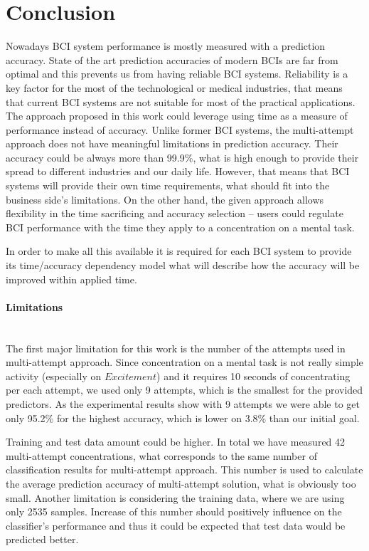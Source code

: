 \documentclass[12pt]{article}
\theoremstyle{definition}
\begin{document}
\newpage
\section*{Conclusion}

Nowadays BCI system performance is mostly measured with a prediction accuracy. State of the art prediction accuracies of modern BCIs are far from optimal and this prevents us from having reliable BCI systems. Reliability is a key factor for the most of the technological or medical industries, that means that current BCI systems are not suitable for most of the practical applications. The approach proposed in this work could leverage using time as a measure of performance instead of accuracy. Unlike former BCI systems, the multi-attempt approach does not have meaningful limitations in prediction accuracy. Their accuracy could be always more than 99.9\%, what is high enough to  provide their spread to different industries and our daily life. However, that means that BCI systems will provide their own time requirements, what should fit into the business side's limitations. On the other hand, the given approach allows flexibility in the time sacrificing and accuracy selection -- users could regulate BCI performance with the time they apply to a concentration on a mental task.

In order to make all this available it is required for each BCI system to provide its time/accuracy dependency model what will describe how the accuracy will be improved within applied time. 


\paragraph{Limitations}~\\

The first major limitation for this work is the number of the attempts used in multi-attempt approach. Since concentration on a mental task is not really simple activity (especially on $Excitement$) and it requires 10 seconds of concentrating per each attempt, we used only 9 attempts, which is the smallest for the provided predictors. As the experimental results show with 9 attempts we were able to get only 95.2\% for the highest accuracy, which is lower on 3.8\% than our initial goal.

Training and test data amount could be higher. In total we have measured 42 multi-attempt concentrations, what corresponds to the same number of classification results for multi-attempt approach. This number is used to calculate the average prediction accuracy of multi-attempt solution, what is obviously too small.
Another limitation is considering the training data, where we are using only 2535 samples. Increase of this number should positively influence on the classifier's performance and thus it could be expected that test data would be predicted better.
\end{document}
